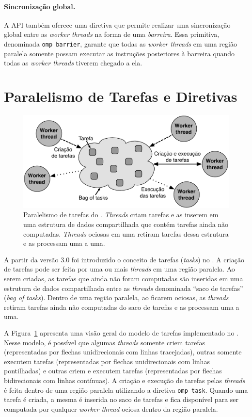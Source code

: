 \documentclass{SBCbookchapter}
\begin{document}
		\paragraph{Sincronização global.} A API \openmp também oferece uma
		diretiva que permite realizar uma sincronização global entre as
		\textit{worker threads} na forma de uma \textit{barreira}. Essa
		primitiva, denominada \texttt{omp barrier}, garante que todas as
		\textit{worker threads} em uma região paralela somente possam executar
		as instruções posteriores à barreira quando todas as \textit{worker threads}
		tiverem chegado a ela.
	
\section{Paralelismo de Tarefas e Diretivas \openmp}
\label{sec:paralelismo tarefas}

	\begin{figure}[t]
		\centering
		\includegraphics[width=0.6\linewidth]{img/tasks}
		\caption{Paralelismo de tarefas do \openmp. \textit{Threads} criam
		tarefas e as inserem em uma estrutura de dados compartilhada
		que contém tarefas ainda não computadas. \textit{Threads} ociosas em
		uma retiram tarefas dessa estrutura e as processam uma a
		uma.}
		\label{fig:tasks}
	\end{figure}

	A partir da versão 3.0 foi introduzido o conceito de tarefas
	(\textit{tasks}) no \openmp. A criação de tarefas pode ser feita por uma ou
	mais \textit{threads} em uma região paralela. Ao serem criadas, as
	tarefas que ainda não foram computadas são inseridas em uma
	estrutura de dados compartilhada entre as \textit{threads}
	denominada ``saco de tarefas'' (\textit{bag of tasks}). Dentro de
	uma região paralela, ao ficarem ociosas, as \textit{threads} retiram
	tarefas ainda não computadas do saco de tarefas e as processam uma a
	uma.
	
	A Figura~\ref{fig:tasks} apresenta uma visão geral do modelo de
	tarefas implementado no \openmp. Nesse modelo, é possível que
	algumas \textit{threads} somente criem tarefas (representadas por
	flechas unidirecionais com linhas tracejadas), outras somente executem
	tarefas (representadas por flechas unidirecionais com linhas pontilhadas)
	e outras criem e executem tarefas (representadas por
	flechas bidirecionais com linhas contínuas).  A criação e execução
	de tarefas pelas \textit{threads} é feita dentro de uma região
	paralela utilizando a diretiva \texttt{omp task}. Quando uma tarefa
	é criada, a mesma é inserida no saco de tarefas e fica disponível
	para ser computada por qualquer \textit{worker thread} ociosa dentro
	da região paralela.
\end{document}
